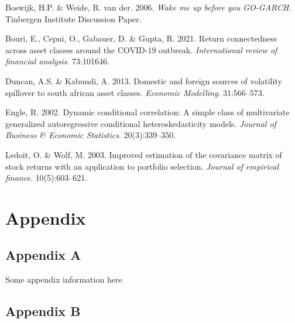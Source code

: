 \documentclass[11pt,preprint, authoryear]{elsarticle}
\numberwithin{equation}{section}
\numberwithin{figure}{section}
\numberwithin{table}{section}
\newlength{\cslhangindent}
\newenvironment{CSLReferences}%
  {\setlength{\parindent}{0pt}%
  \everypar{\setlength{\hangindent}{\cslhangindent}}\ignorespaces}%
  {\par}
\begin{document}
\hypertarget{refs}{}
\begin{CSLReferences}{1}{0}
\leavevmode{}%
Boswijk, H.P. \& Weide, R. van der. 2006. \emph{Wake me up before you
GO-GARCH}. Tinbergen Institute Discussion Paper.

\leavevmode{}%
Bouri, E., Cepni, O., Gabauer, D. \& Gupta, R. 2021. Return
connectedness across asset classes around the COVID-19 outbreak.
\emph{International review of financial analysis}. 73:101646.

\leavevmode{}%
Duncan, A.S. \& Kabundi, A. 2013. Domestic and foreign sources of
volatility spillover to south african asset classes. \emph{Economic
Modelling}. 31:566--573.

\leavevmode{}%
Engle, R. 2002. Dynamic conditional correlation: A simple class of
multivariate generalized autoregressive conditional heteroskedasticity
models. \emph{Journal of Business \& Economic Statistics}.
20(3):339--350.

\leavevmode{}%
Ledoit, O. \& Wolf, M. 2003. Improved estimation of the covariance
matrix of stock returns with an application to portfolio selection.
\emph{Journal of empirical finance}. 10(5):603--621.

\end{CSLReferences}

\hypertarget{appendix}{%
\section*{Appendix}\label{appendix}}

\hypertarget{appendix-a}{%
\subsection*{Appendix A}\label{appendix-a}}

Some appendix information here

\hypertarget{appendix-b}{%
\subsection*{Appendix B}\label{appendix-b}}


\end{document}
